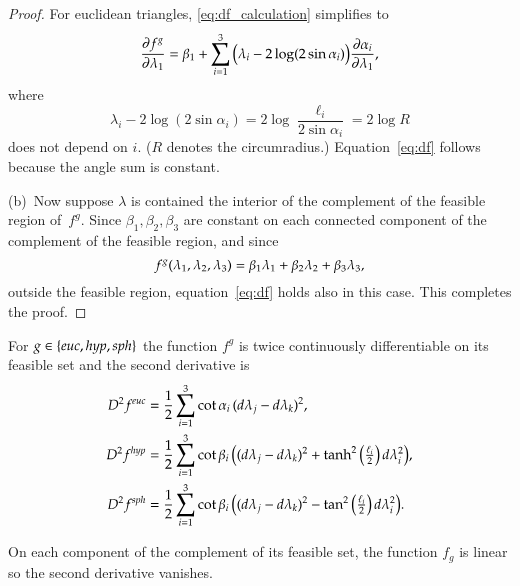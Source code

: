 \documentclass[Thesis]{subfiles}
\begin{document}
\begin{proof}
  For euclidean triangles, \eqref{eq:df_calculation} simplifies to
  \begin{equation*}
    \frac{\partial f^{g}}{\partial\lambda_{1}}
    =
    \beta_{1} + \sum_{i=1}^{3}
    \big(\lambda_{i} - 2\log(2\sin\alpha_{i})\big)
    \frac{\partial\alpha_{i}}{\partial\lambda_{1}},
  \end{equation*}  
  where
  \begin{equation*}
    \lambda_{i}-2\log(2\sin\alpha_{i})=2\log\frac{\ell_{i}}{2\sin\alpha_{i}}
    =2\log R
  \end{equation*}
  does not depend on $i$. ($R$ denotes the circumradius.)
  Equation~\eqref{eq:df} follows because the angle sum is constant.

  (b)\, Now suppose $\lambda$ is contained the interior of the complement of
  the feasible region of~$f^{g}$. Since
  $\beta_{1},\beta_{2},\beta_{3}$ are constant on each connected
  component of the complement of the feasible region, and since
  \begin{equation*}
    f^{g}(\lambda_{1}, \lambda_{2}, \lambda_{3}) 
    = \beta_{1} \lambda_{1} 
    + \beta_{2} \lambda_{2} 
    + \beta_{3} \lambda_{3},
  \end{equation*}
  outside the feasible region, equation~\ref{eq:df} holds also in
  this case. This completes the proof.
\end{proof}

\begin{proposition}
  \label{prop:ddf}
  For $\g\in\{\euc,\hyp,\sph\}$ the function $f^{g}$ is twice
  continuously differentiable on its feasible set and
  the second derivative is 
  \begin{align}
    \label{eq:ddf_euc}
    D^{2}f^{\euc} &= 
    \frac{1}{2}\sum_{i=1}^{3} \cot\alpha_{i}\,
    (d\lambda_{j}-d\lambda_{k})^{2},\\
    \label{eq:ddf_hyp}
    D^{2}f^{\hyp} &=
    \frac{1}{2}\sum_{i=1}^{3} \cot\beta_{i}\,
    \big(
    (d\lambda_{j}-d\lambda_{k})^{2}
    +\tanh^{2}\big(
    \tfrac{\ell_{i}}{2}
    \big)\,
    d\lambda_{i}^{2}
    \big),\\
    \label{eq:ddf_sph}
    D^{2}f^{\sph} &=
    \frac{1}{2}\sum_{i=1}^{3} \cot\beta_{i}\,
    \big(
    (d\lambda_{j}-d\lambda_{k})^{2}
    -\tan^{2}\big(
    \tfrac{\ell_{i}}{2}
    \big)\,
    d\lambda_{i}^{2}
    \big).
  \end{align}
  
  On each component of the complement of its feasible set, the
  function $f_{g}$ is linear so the second derivative vanishes.
\end{proposition}
\end{document}
